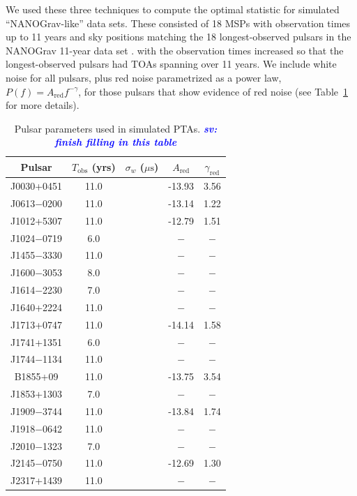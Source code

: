 \documentclass[twocolumn,aps,prd,superscriptaddress]{revtex4-1}
\newcommand{\sv}[1]{\textcolor{blue}{\it{\textbf{sv: #1}}} }
\begin{document}
We used these three techniques to compute the optimal statistic 
for simulated ``NANOGrav-like'' data sets. 
These consisted of 18 MSPs with observation times up to 11 years 
and sky positions matching the 18 longest-observed pulsars in the 
NANOGrav 11-year data set \citep{abb+17}.
with the observation times increased so that the longest-observed pulsars 
had TOAs spanning over 11 years. 
We include white noise for all pulsars, plus 
red noise parametrized as a power law, $P(f) = A_\mathrm{red} f^{-\gamma}$, 
for those pulsars that show evidence of red noise 
(see Table~\ref{tab:sim} for more details).
\begin{table}[t]
	\setlength{\tabcolsep}{5pt}
	\caption{Pulsar parameters used in simulated PTAs. \sv{finish filling in this table}}
	\begin{center}
	\begin{tabular}{ccccc}
		\hline\hline
    		Pulsar	& $T_\mathrm{obs}$ (yrs) & $\sigma_w$ ($\mu\mathrm{s}$) & $A_\mathrm{red}$ & $\gamma_\mathrm{red}$ \\
		\hline
		J0030+0451 & 11.0 & & -13.93 & 3.56 \\
		J0613$-$0200 & 11.0 &  & -13.14 & 1.22 \\
		J1012+5307 & 11.0 &  & -12.79 & 1.51 \\
		J1024$-$0719 & 6.0 & & $-$ & $-$ \\
		J1455$-$3330 & 11.0 & & $-$ & $-$ \\
		J1600$-$3053 & 8.0 & & $-$ & $-$ \\
		J1614$-$2230 & 7.0 & & $-$ & $-$ \\
		J1640+2224 & 11.0 & & $-$ & $-$ \\
		J1713+0747 & 11.0 & & -14.14 & 1.58 \\
		J1741+1351 & 6.0 & & $-$ & $-$ \\
		J1744$-$1134 & 11.0 & & $-$ & $-$ \\
		B1855+09 & 11.0 & & -13.75 & 3.54 \\
		J1853+1303 & 7.0 & & $-$ & $-$ \\
		J1909$-$3744 & 11.0 &  & -13.84 & 1.74  \\
		J1918$-$0642 & 11.0 & & $-$ & $-$ \\
		J2010$-$1323 & 7.0 & & $-$ & $-$ \\
		J2145$-$0750 & 11.0 &  & -12.69 & 1.30 \\
		J2317+1439 & 11.0 & & $-$ & $-$ \\
    		\hline\hline
	\end{tabular}
	\end{center}
	\label{tab:sim}
\end{table}
\end{document}
